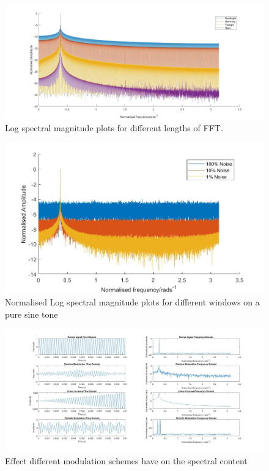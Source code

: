 \documentclass[10.9pt]{article}
\begin{document}
\begin{figure} [H]
\centering	\includegraphics[scale = 0.3]
{Window_compare}
\caption{Log spectral magnitude plots for different lengths of FFT.}
\label{Window_compare}
\end{figure}

\begin{figure} [H]
\centering	\includegraphics[scale = 0.4]
{Noise}
\caption{Normalised Log spectral magnitude plots for different windows on a pure sine tone}
\label{Noise}
\end{figure}

\begin{figure} [H]
\centering	\includegraphics[scale = 0.28]
{Modulation}
\caption{Effect different modulation schemes have on the spectral content}
\label{Modulation}
\end{figure}
\end{document}
